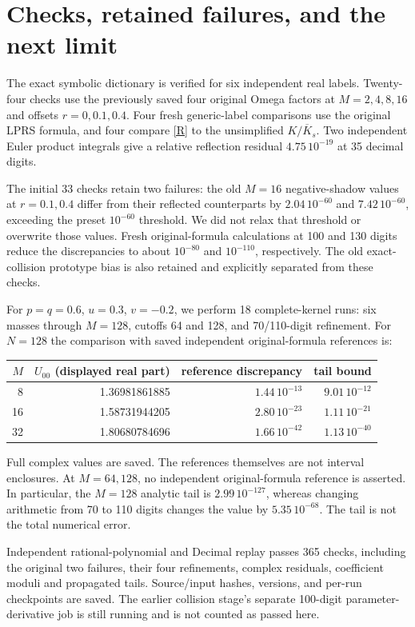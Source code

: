 \documentclass[11pt,a4paper]{article}
\begin{document}
\newpage
\section{Checks, retained failures, and the next limit}
The exact symbolic dictionary is verified for six independent real labels.
Twenty-four checks use the previously saved four original Omega factors
at $M=2,4,8,16$ and offsets $r=0,0.1,0.4$.
Four fresh generic-label comparisons use the original LPRS formula,
and four compare \eqref{R} to the unsimplified $K/\overline K_s$.
Two independent Euler product integrals give a relative reflection
residual $4.75\,10^{-19}$ at 35 decimal digits.

The initial 33 checks retain two failures: the old $M=16$ negative-shadow
values at $r=0.1,0.4$ differ from their reflected counterparts by
$2.04\,10^{-60}$ and $7.42\,10^{-60}$, exceeding the preset $10^{-60}$
threshold. We did not relax that threshold or overwrite those values.
Fresh original-formula calculations at 100 and 130 digits reduce the
discrepancies to about $10^{-80}$ and $10^{-110}$, respectively.
The old exact-collision prototype bias is also retained and explicitly
separated from these checks.

For $p=q=0.6$, $u=0.3$, $v=-0.2$, we perform 18 complete-kernel runs:
six masses through $M=128$, cutoffs 64 and 128, and 70/110-digit refinement.
For $N=128$ the comparison with saved independent original-formula
references is:
\begin{center}
\begin{tabular}{rrrr}
\toprule
$M$ & $U_{00}$ (displayed real part) & reference discrepancy & tail bound\\
\midrule
8  &1.36981861885&$1.44\,10^{-13}$&$9.01\,10^{-12}$\\
16 &1.58731944205&$2.80\,10^{-23}$&$1.11\,10^{-21}$\\
32 &1.80680784696&$1.66\,10^{-42}$&$1.13\,10^{-40}$\\
\bottomrule
\end{tabular}
\end{center}
Full complex values are saved. The references themselves are not interval
enclosures. At $M=64,128$, no independent original-formula reference is
asserted. In particular, the $M=128$ analytic tail is $2.99\,10^{-127}$,
whereas changing arithmetic from 70 to 110 digits changes the value by
$5.35\,10^{-68}$. The tail is not the total numerical error.

Independent rational-polynomial and Decimal replay passes 365 checks,
including the original two failures, their four refinements, complex
residuals, coefficient moduli and propagated tails. Source/input hashes,
versions, and per-run checkpoints are saved.
The earlier collision stage's separate 100-digit parameter-derivative
job is still running and is not counted as passed here.
\end{document}
